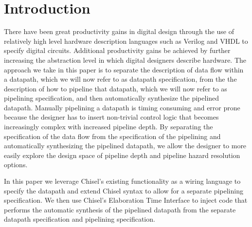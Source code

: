 \section{Introduction}
There have been great productivity gains in digital design through the use of relatively high level hardware description languages such as Verilog and VHDL to specify digital circuits. Additional productivity gains be achieved by further increasing the abstraction level in which digital designers describe hardware. The approach we take in this paper is to separate the description of data flow within a datapath, which we will now refer to as datapath specification, from the the description of how to pipeline that datapath, which we will now refer to as pipelining specification, and then automatically synthesize the pipelined datapath. Manually pipelining a datapath is timing consuming and error prone because the designer has to insert non-trivial control logic that becomes increasingly complex with increased pipeline depth. By separating the specification of the data flow from the specification of the pipelining and automatically synthesizing the pipelined datapath, we allow the designer to more easily explore the design space of pipeline depth and pipeline hazard resolution options. 

In this paper we leverage Chisel's existing functionality as a wiring language to specify the datapath and extend Chisel syntax to allow for a separate pipelining specification. We then use Chisel's Elaboration Time Interface to inject code that performs the automatic synthesis of the pipelined datapath from the separate datapath specification and pipelining specification.

